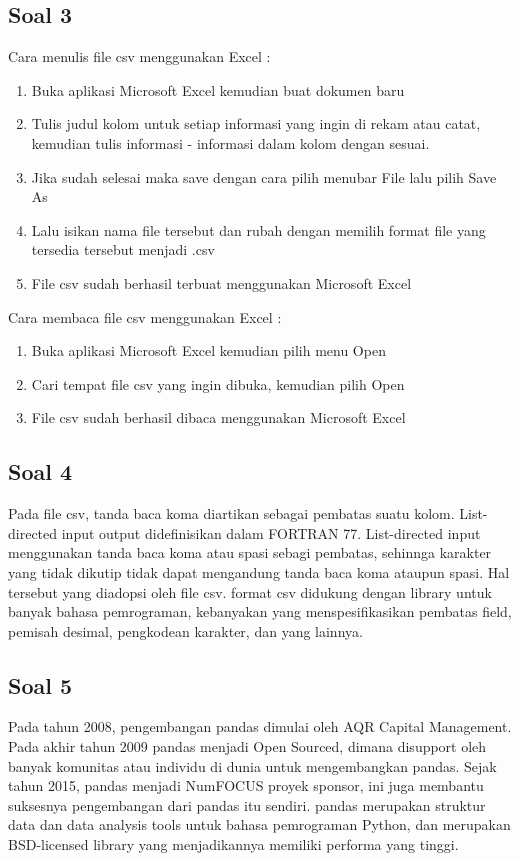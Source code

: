 	\subsection{Soal 3}
	Cara menulis file csv menggunakan Excel :
		\begin{enumerate}
			\item Buka aplikasi Microsoft Excel kemudian buat dokumen baru
			\item Tulis judul kolom untuk setiap informasi yang ingin di rekam atau catat, kemudian tulis informasi - informasi dalam kolom dengan sesuai.
			\item Jika sudah selesai maka save dengan cara pilih menubar File lalu pilih Save As
			\item Lalu isikan nama file tersebut dan rubah dengan memilih format file yang tersedia tersebut menjadi .csv
			\item File csv sudah berhasil terbuat menggunakan Microsoft Excel
		\end{enumerate}
				
	Cara membaca file csv menggunakan Excel :
		\begin{enumerate}
			\item Buka aplikasi Microsoft Excel kemudian pilih menu Open
			\item Cari tempat file csv yang ingin dibuka, kemudian pilih Open
			\item File csv sudah berhasil dibaca menggunakan Microsoft Excel
		\end{enumerate}	
				
	\subsection{Soal 4}
	Pada file csv, tanda baca koma diartikan sebagai pembatas suatu kolom. List-directed input output didefinisikan dalam FORTRAN 77. List-directed input menggunakan tanda baca koma atau spasi sebagi pembatas, sehinnga karakter yang tidak dikutip tidak dapat mengandung tanda baca koma ataupun spasi. Hal tersebut yang diadopsi oleh file csv. format csv didukung dengan library untuk banyak bahasa pemrograman, kebanyakan yang menspesifikasikan pembatas field, pemisah desimal, pengkodean karakter, dan yang lainnya.
	
	\subsection{Soal 5}
	Pada tahun 2008, pengembangan pandas dimulai oleh AQR Capital Management. Pada akhir tahun 2009 pandas menjadi Open Sourced, dimana disupport oleh banyak komunitas atau individu di dunia untuk mengembangkan pandas. Sejak tahun 2015, pandas menjadi NumFOCUS proyek sponsor, ini juga membantu suksesnya pengembangan dari pandas itu sendiri. pandas merupakan struktur data dan data analysis tools untuk bahasa pemrograman Python, dan merupakan BSD-licensed library yang menjadikannya memiliki performa yang tinggi.
	
